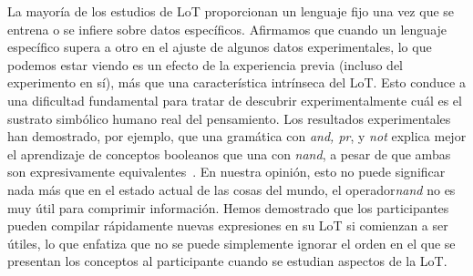 La mayoría de los estudios de LoT proporcionan un lenguaje fijo una vez que se entrena o se infiere sobre datos específicos. Afirmamos que cuando un lenguaje específico supera a otro en el ajuste de algunos datos experimentales, lo que podemos estar viendo es un efecto de la experiencia previa (incluso del experimento en sí), más que una característica intrínseca del LoT. Esto conduce a una dificultad fundamental para tratar de descubrir experimentalmente cuál es el sustrato simbólico humano real del pensamiento. Los resultados experimentales han demostrado, por ejemplo, que una gramática con \textit{and, pr}, y \textit{not} explica mejor el aprendizaje de conceptos booleanos que una con \textit{nand}, a pesar de que ambas son expresivamente equivalentes~\cite{piantadosi2016logical}. En nuestra opinión, esto no puede significar nada más que en el estado actual de las cosas del mundo, el operador\textit{nand} no es muy útil para comprimir información. Hemos demostrado que los participantes pueden compilar rápidamente nuevas expresiones en su LoT si comienzan a ser útiles, lo que enfatiza que no se puede simplemente ignorar el orden en el que se presentan los conceptos al participante cuando se estudian aspectos de la LoT.

